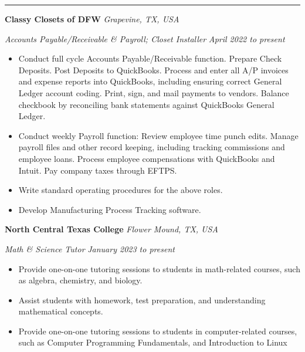 \documentclass[10pt, a4paper]{article}
\newcommand{\rangesep}{to\xspace}  %
\renewcommand{\date}[1]{\textit{#1}}
\newcommand{\location}[1]{\textit{#1}}
\newcommand{\heading}[1]{
    \makebox[0pt][l]{\Large \sc \hspace{2pt}#1}
    \rule[-0.7ex]{\columnwidth}{0.5pt}\vspace{1.0ex}
}
\newcommand{\subheading}[1]{{\bfseries #1}}
\newcommand{\subheadSkip}{\vspace{0.7ex}}
\newenvironment{mysection}[1]
{\vspace{2.5ex}
\heading{#1}
\begin{adjustwidth}{0.3cm}{0cm}}
{\end{adjustwidth} }
\begin{document}
    \begin{mysection}{Employment}
        \subheading{Classy Closets of DFW} \hfill \location{Grapevine, TX, USA}

        \textit{Accounts Payable/Receivable \& Payroll; Closet Installer } \hfill \date{April 2022 \rangesep present}

        \vspace{0.1ex}


        \begin{itemize}
            \item Conduct full cycle Accounts Payable/Receivable function. Prepare Check Deposits. Post Deposits to QuickBooks. Process and enter all A/P invoices and expense reports into QuickBooks, including ensuring correct General Ledger account coding. Print, sign, and mail payments to vendors. Balance checkbook by reconciling bank statements against QuickBooks General Ledger.
            \item Conduct weekly Payroll function: Review employee time punch edits. Manage payroll files and other record keeping, including tracking commissions and employee loans. Process employee compensations with QuickBooks and Intuit. Pay company taxes through EFTPS.
            \item Write standard operating procedures for the above roles.
            \item Develop Manufacturing Process Tracking software.
        \end{itemize}

        \subheadSkip
        \subheading{North Central Texas College} \hfill \location{Flower Mound, TX, USA}

        \vspace{0.1ex}
        \textit{Math \& Science Tutor} \hfill \date{January 2023 \rangesep present}
        \begin{itemize}
            \item Provide one-on-one tutoring sessions to students in math-related courses, such as algebra, chemistry, and biology.
            \item Assist students with homework, test preparation, and understanding mathematical concepts.
            \item Provide one-on-one tutoring sessions to students in computer-related courses, such as Computer Programming Fundamentals, and Introduction to Linux 
        \end{itemize}


\end{mysection}
\end{document}
